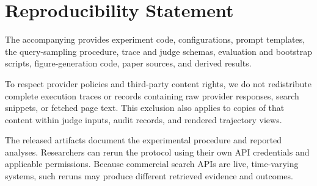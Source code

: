 \section*{Reproducibility Statement}
The accompanying \ReleaseArtifactLink{} provides experiment code, configurations, prompt templates, the query-sampling procedure, trace and judge schemas, evaluation and bootstrap scripts, figure-generation code, paper sources, and derived results.

To respect provider policies and third-party content rights, we do not redistribute complete execution traces or records containing raw provider responses, search snippets, or fetched page text. This exclusion also applies to copies of that content within judge inputs, audit records, and rendered trajectory views.

The released artifacts document the experimental procedure and reported analyses. Researchers can rerun the protocol using their own API credentials and applicable permissions. Because commercial search APIs are live, time-varying systems, such reruns may produce different retrieved evidence and outcomes.



\clearpage
\appendix
\setlength{\emergencystretch}{1.5em}
\begin{reviewdisplay}

\end{reviewdisplay}
\endinput
